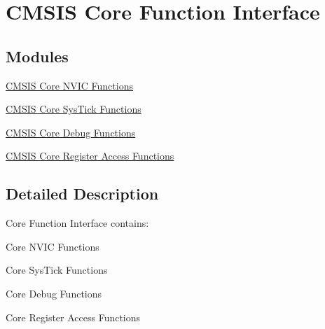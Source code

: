 \hypertarget{group___c_m_s_i_s___core___function_interface}{\section{C\-M\-S\-I\-S Core Function Interface}
\label{group___c_m_s_i_s___core___function_interface}
}
\subsection*{Modules}
\begin{DoxyCompactItemize}
\item 
\hyperlink{group___c_m_s_i_s___core___n_v_i_c_functions}{C\-M\-S\-I\-S Core N\-V\-I\-C Functions}
\item 
\hyperlink{group___c_m_s_i_s___core___sys_tick_functions}{C\-M\-S\-I\-S Core Sys\-Tick Functions}
\item 
\hyperlink{group___c_m_s_i_s__core___debug_functions}{C\-M\-S\-I\-S Core Debug Functions}
\item 
\hyperlink{group___c_m_s_i_s___core___reg_acc_functions}{C\-M\-S\-I\-S Core Register Access Functions}
\end{DoxyCompactItemize}


\subsection{Detailed Description}
Core Function Interface contains\-:
\begin{DoxyItemize}
\item Core N\-V\-I\-C Functions
\item Core Sys\-Tick Functions
\item Core Debug Functions
\item Core Register Access Functions 
\end{DoxyItemize}